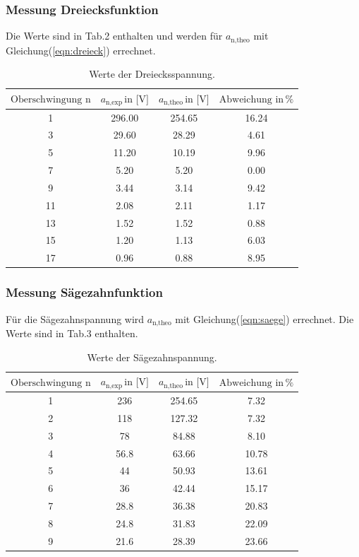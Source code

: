 \subsubsection{Messung Dreiecksfunktion}
Die Werte sind in Tab.2 enthalten und werden für $a_\text{n,theo} $ mit Gleichung(\ref{eqn:dreieck})
errechnet.
  \begin{table}[h]
    \centering
    \label{tab:2}
    \begin{tabular}{ c c c c  }
      \toprule
     $ \text{Oberschwingung n} $
     &$ a_\text{n,exp} \, \text{in [V]} $
     &$ a_\text{n,theo} \, \text{in  [V]} $
     &$ \text{Abweichung in} \, \si{\percent} $\\

      \midrule
      1& 296.00    & 254.65 & 16.24\\
      3& 29.60  & 28.29 & 4.61\\
      5&  11.20 & 10.19 & 9.96\\
      7&  5.20 & 5.20 &0.00\\
      9&  3.44 & 3.14 &9.42\\
      11& 2.08 & 2.11& 1.17\\
      13& 1.52 & 1.52& 0.88\\
      15& 1.20 & 1.13& 6.03\\
      17& 0.96 & 0.88&8.95\\
      \bottomrule
    \end{tabular}
    \caption{Werte der Dreiecksspannung.}
  \end{table}
  \subsubsection{Messung Sägezahnfunktion}
  Für die Sägezahnspannung wird $a_\text{n,theo} $ mit Gleichung(\ref{eqn:saege})
  errechnet. Die Werte sind in Tab.3 enthalten.
  \begin{table}[h]
    \centering
    \label{tab:3}
    \begin{tabular}{ c c c c  }
      \toprule
     $ \text{Oberschwingung n} $
     &$ a_\text{n,exp} \, \text{in [V]} $
     &$ a_\text{n,theo} \, \text{in  [V]} $
     &$ \text{Abweichung in} \, \si{\percent} $\\

      \midrule
      1&236  & 254.65& 7.32 \\
      2&118  & 127.32& 7.32\\
      3& 78  &  84.88& 8.10\\
      4& 56.8&  63.66& 10.78\\
      5& 44  &  50.93& 13.61\\
      6& 36  &  42.44& 15.17\\
      7& 28.8&  36.38& 20.83\\
      8& 24.8&  31.83& 22.09\\
      9& 21.6&  28.39& 23.66\\

      \bottomrule
    \end{tabular}
    \caption{Werte der Sägezahnspannung.}
  \end{table}

